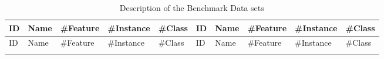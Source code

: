\documentclass[review,3p]{elsarticle}
\begin{document}
		\begin{longtable}{p{0.1cm}lp{0.8cm}<{\centering}p{0.8cm}<{\centering}p{0.9cm}<{\centering}|p{0.1cm}lp{0.8cm}<{\centering}p{0.8cm}<{\centering}p{0.9cm}<{\centering}}
			
			\caption{Description of the Benchmark Data sets}
			\label{table: Benchmark Data}  \\ %
			
			\hline
			ID	&	Name	&	\#Feature	&	\#Instance	&	\#Class	&	ID	&	Name	&	\#Feature	&	\#Instance	&	\#Class	\\ \hline
			\endfirsthead
			
			\hline
			ID	&	Name	&	\#Feature	&	\#Instance	&	\#Class	&	ID	&	Name	&	\#Feature	&	\#Instance	&	\#Class	\\ \hline
			\endhead 
			
			\hline
			\endfoot 
			
			\hline																			
			

\end{longtable}
\end{document}
